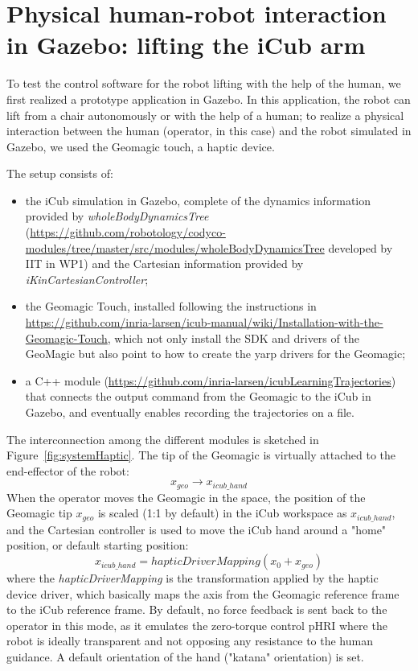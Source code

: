 

\section{Physical human-robot interaction in Gazebo: lifting the iCub arm}

To test the control software for the robot lifting with the help of the human, we first realized a prototype application in Gazebo. In this application, the robot can lift from a chair autonomously or with the help of a human; to realize a physical interaction between the human (operator, in this case) and the robot simulated in Gazebo, we used the Geomagic touch, a haptic device.

The setup consists of:
\begin{itemize}
\item the iCub simulation in Gazebo, complete of the dynamics information provided by \textit{wholeBodyDynamicsTree} (\url{https://github.com/robotology/codyco-modules/tree/master/src/modules/wholeBodyDynamicsTree} developed by IIT in WP1) and the Cartesian information provided by \textit{iKinCartesianController};
\item the Geomagic Touch, installed following the instructions in \url{https://github.com/inria-larsen/icub-manual/wiki/Installation-with-the-Geomagic-Touch}, which not only install the SDK and drivers of the GeoMagic but also point to how to create the yarp drivers for the Geomagic;
\item a C++ module (\url{https://github.com/inria-larsen/icubLearningTrajectories}) that connects the output command from the Geomagic to the iCub in Gazebo, and eventually enables recording the trajectories on a file.
\end{itemize}

The interconnection among the different modules is sketched in Figure~\ref{fig:systemHaptic}.
The tip of the Geomagic is virtually attached to the end-effector of the robot:
$$ x_{geo} \rightarrow x_{icub\_hand} $$
When the operator moves the Geomagic in the space, the position of the Geomagic tip $x_{geo}$ is scaled (1:1 by default) in the iCub workspace as $x_{icub\_hand}$, and the Cartesian controller is used to move the iCub hand around a "home" position, or default starting position:
$$ x_{icub\_hand} = hapticDriverMapping(x_0 + x_{geo})$$
where the \textit{hapticDriverMapping} is the transformation applied by the haptic device driver, which basically maps the axis from the Geomagic reference frame to the iCub reference frame.
By default, no force feedback is sent back to the operator in this mode, as it emulates the zero-torque control pHRI where the robot is ideally transparent and not opposing any resistance to the human guidance. A default orientation of the hand ("katana" orientation) is set.

